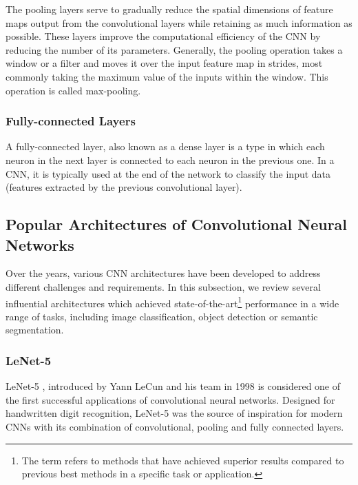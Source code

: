 The pooling layers serve to gradually reduce the spatial dimensions of feature
maps output from the convolutional layers while retaining as much information as
possible. These layers improve the computational efficiency of the CNN by
reducing the number of its parameters. Generally, the pooling operation takes a
window or a filter and moves it over the input feature map in strides, most
commonly taking the maximum value of the inputs within the window. This
operation is called max-pooling. \cite{OShea2015}


\subsubsection{Fully-connected Layers}

A fully-connected layer, also known as a dense layer is a type in which each
neuron in the next layer is connected to each neuron in the previous one. In a
CNN, it is typically used at the end of the network to classify the input data
(features extracted by the previous convolutional layer). \cite{OShea2015}


\subsection{Popular Architectures of Convolutional Neural Networks}


Over the years, various CNN architectures have been developed to address
different challenges and requirements. In this subsection, we review several
influential architectures which achieved state-of-the-art\footnote{The term
 refers to methods that have achieved superior results
compared to previous best methods in a specific task or application.}
performance in a wide range of tasks, including image classification, object
detection or semantic segmentation.


\subsubsection{LeNet-5}

LeNet-5 \cite{Lecun1998}, introduced by Yann LeCun and his team in 1998 is
considered one of the first successful applications of convolutional neural
networks.  Designed for handwritten digit recognition, LeNet-5 was the source of
inspiration for modern CNNs with its combination of convolutional, pooling and
fully connected layers.


